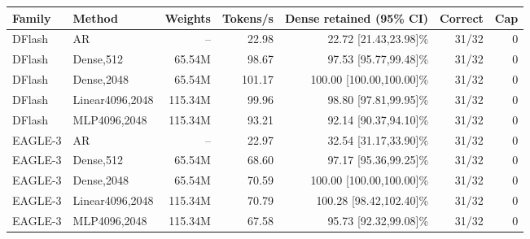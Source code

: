 \begin{tabular}{llrrrrr}
\toprule
Family & Method & Weights & Tokens/s & Dense retained (95\% CI) & Correct & Cap \\
\midrule
DFlash & AR & -- & 22.98 & 22.72 [21.43,23.98]\% & 31/32 & 0 \\
DFlash & Dense,512 & 65.54M & 98.67 & 97.53 [95.77,99.48]\% & 31/32 & 0 \\
DFlash & Dense,2048 & 65.54M & 101.17 & 100.00 [100.00,100.00]\% & 31/32 & 0 \\
DFlash & Linear4096,2048 & 115.34M & 99.96 & 98.80 [97.81,99.95]\% & 31/32 & 0 \\
DFlash & MLP4096,2048 & 115.34M & 93.21 & 92.14 [90.37,94.10]\% & 31/32 & 0 \\
\midrule
EAGLE-3 & AR & -- & 22.97 & 32.54 [31.17,33.90]\% & 31/32 & 0 \\
EAGLE-3 & Dense,512 & 65.54M & 68.60 & 97.17 [95.36,99.25]\% & 31/32 & 0 \\
EAGLE-3 & Dense,2048 & 65.54M & 70.59 & 100.00 [100.00,100.00]\% & 31/32 & 0 \\
EAGLE-3 & Linear4096,2048 & 115.34M & 70.79 & 100.28 [98.42,102.40]\% & 31/32 & 0 \\
EAGLE-3 & MLP4096,2048 & 115.34M & 67.58 & 95.73 [92.32,99.08]\% & 31/32 & 0 \\
\bottomrule
\end{tabular}
